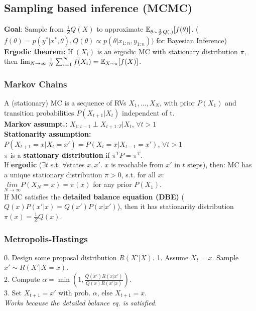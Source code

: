 \subsection{Sampling based inference (MCMC)}
\textbf{Goal}: Sample from $\frac{1}{Z}Q(X)$ to approximate
$\mathbb{E}_{\theta\sim\frac{1}{Z}Q(.)}[f(\theta)]$. ($f(\theta) = p(y^*|x^*,\theta), Q(\theta)\propto p(\theta|x_{1:n},y_{1:n}))$ for Bayesian Inference)\\
\textbf{Ergodic theorem:} If $(X_i)$ is an ergodic MC with stationary distribution $\pi$, then
$\lim_{N\to\infty}\frac{1}{N}\sum_{i=1}^{N}f(X_i) = \mathbb{E}_{X\sim\pi}[f(X)]$. 

\subsubsection{Markov Chains}
A (stationary) MC is a sequence of RVs $X_1, ..., X_N$, with prior $P(X_1)$ and transition probabilities $P(X_{t+1}|X_t)$ independent of t.\\
\textbf{Markov assumpt.:} $X_{1:t-1}\perp X_{t+1:T}|X_t$, $\forall t>1$\\
\textbf{Stationarity assumption:}\\
$P(X_{t+1}=x|X_t=x')=P(X_{t}=x|X_{t-1}=x')$, $\forall t>1$\\
$\pi$ is a \textbf{stationary distribution} if $\pi^TP = \pi^T$.\\
If \textbf{ergodic} ($\exists t$ s.t. $\forall$states $x, x'$\!. $x$ is reachable from $x'$ in $t$ steps), then: MC has a unique stationary distribution $\pi > 0$, s.t. for all $x$:\\
            $\underset{N\rightarrow\infty}{lim}P(X_N=x)=\pi(x)$ for any prior $P(X_1)$.\\
If MC satisfies the \textbf{detailed balance equation (DBE)} ($Q(x)P(x'|x)=Q(x')P(x|x')$), then it has stationarity distribution $\pi(x)=\frac{1}{Z}Q(x)$.

\subsubsection{Metropolis-Hastings}
0. Design some proposal distribution $R(X'|X)$.
1. Assume $X_t = x$. Sample $x' \sim R(X'|X=x)$.\\
2. Compute $\alpha = \min(1, \frac{Q(x')R(x|x')}{Q(x)R(x'|x)})$.\\
3. Set $X_{t+1} = x'$ with prob. $\alpha$, else $X_{t+1} = x$.
{\tiny\CircArrowRight{}}\\
\emph{Works because the detailed balance eq. is satisfied.}
